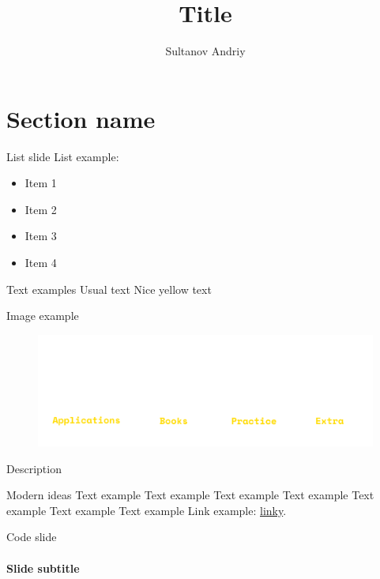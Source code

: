 \documentclass[usenames,dvipsnames,10pt,aspectratio=169]{beamer}
\title[Title]{Title}
\author[Sultanov Andriy]{Sultanov Andriy}
\institute{APPS@UCU}
\begin{document}
\begin{frame}
\titlepage
\end{frame}

\begin{frame}{\contentsname}
\tableofcontents
\end{frame}


\section{Section name}

\begin{frame}{List slide}
\large	
List example:
\vspace{0.4cm}
\begin{itemize}[label=$\bullet$]
	\item Item 1
	\item Item 2
	\item Item 3
	\item Item 4
\end{itemize}
\end{frame}

\begin{frame}{Text examples}
\large
Usual text
\vspace{0.2cm}
\textcolor{ucuyellow}{Nice yellow text}\\
\end{frame}

\begin{frame}{Image example}
	\Large
	\centering
	\begin{figure}[c]
		\includegraphics[width=1\linewidth]{graphics/resources.png}
	\end{figure}
	Description
\end{frame}



\begin{frame}{Modern ideas}
\large
Text example Text example Text example Text 
example Text example Text example Text example
\vspace{0.5cm}
Link example:
\href{https://cowlark.com/2009-11-15-go/}{linky}.

\end{frame}

\begin{frame}{Code slide}
	\framesubtitle{Slide subtitle}
	\inputminted[fontsize=\normalsize]{rust}{code/example1.rs}
\end{frame}

\end{document}
